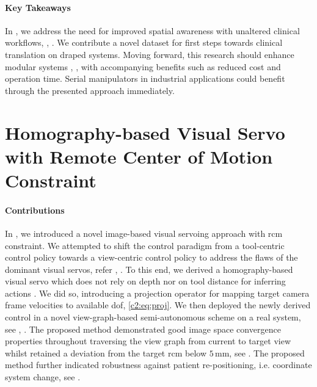 \paragraph{Key Takeaways}
In , we address the need for improved spatial awareness with unaltered clinical workflows, , . We contribute a novel dataset for first steps towards clinical translation on draped systems. Moving forward, this research should enhance modular systems , , with accompanying benefits such as reduced cost and operation time. Serial manipulators in industrial applications could benefit through the presented approach immediately.

\section[Homography-based Visual Servo with RCM]{Homography-based Visual Servo with Remote Center of Motion Constraint}
\label{con:sec:visual_servo}
\paragraph{Contributions} In , we introduced a novel image-based visual servoing approach with \gls{rcm} constraint. We attempted to shift the control paradigm from a tool-centric control policy towards a view-centric control policy to address the flaws of the dominant visual servos, refer , . To this end, we derived a homography-based visual servo which does not rely on depth nor on tool distance for inferring actions . We did so, introducing a projection operator for mapping target camera frame velocities to available \gls{dof}, \eqref{c2:eq:proj}. We then deployed the newly derived control in a novel view-graph-based semi-autonomous scheme on a real system, see , . The proposed method demonstrated good image space convergence properties throughout traversing the view graph from current to target view whilst retained a deviation from the target \gls{rcm} below $5\,\text{mm}$, see . The proposed method further indicated robustness against patient re-positioning, i.e. coordinate system change, see .

